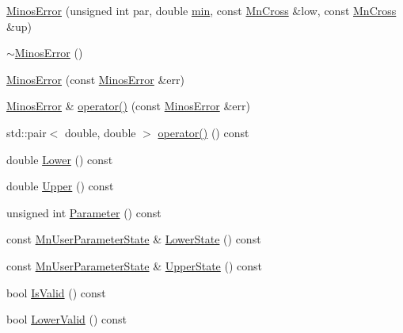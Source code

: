 \begin{DoxyCompactItemize}
\item 
\mbox{\hyperlink{classROOT_1_1Minuit2_1_1MinosError_a400609986f7b4e3a93eab1a35e1f33ce}{Minos\+Error}} (unsigned int par, double \mbox{\hyperlink{adat__devel_2lib_2SU3_2SU3__internal_8h_ab0f5fed3171eb00d1c5f037d9f518a23}{min}}, const \mbox{\hyperlink{classROOT_1_1Minuit2_1_1MnCross}{Mn\+Cross}} \&low, const \mbox{\hyperlink{classROOT_1_1Minuit2_1_1MnCross}{Mn\+Cross}} \&up)
\item 
\mbox{\hyperlink{classROOT_1_1Minuit2_1_1MinosError_a8373afe22cd395ed995a061691c48dad}{$\sim$\+Minos\+Error}} ()
\item 
\mbox{\hyperlink{classROOT_1_1Minuit2_1_1MinosError_a95d558825494f594da873fef3518572e}{Minos\+Error}} (const \mbox{\hyperlink{classROOT_1_1Minuit2_1_1MinosError}{Minos\+Error}} \&err)
\item 
\mbox{\hyperlink{classROOT_1_1Minuit2_1_1MinosError}{Minos\+Error}} \& \mbox{\hyperlink{classROOT_1_1Minuit2_1_1MinosError_ac45b7f3397fe4c13e1811b486e10602a}{operator()}} (const \mbox{\hyperlink{classROOT_1_1Minuit2_1_1MinosError}{Minos\+Error}} \&err)
\item 
std\+::pair$<$ double, double $>$ \mbox{\hyperlink{classROOT_1_1Minuit2_1_1MinosError_ae5c75a96400736de9741f6c5b8314e31}{operator()}} () const
\item 
double \mbox{\hyperlink{classROOT_1_1Minuit2_1_1MinosError_ac412aab9b0a59a427fbe7e3cfad47f0c}{Lower}} () const
\item 
double \mbox{\hyperlink{classROOT_1_1Minuit2_1_1MinosError_a0223fde13608aadee1f15b51d15b2bf6}{Upper}} () const
\item 
unsigned int \mbox{\hyperlink{classROOT_1_1Minuit2_1_1MinosError_a5d4ac177a8075a3698dbecac3a8c552b}{Parameter}} () const
\item 
const \mbox{\hyperlink{classROOT_1_1Minuit2_1_1MnUserParameterState}{Mn\+User\+Parameter\+State}} \& \mbox{\hyperlink{classROOT_1_1Minuit2_1_1MinosError_ac10a407a1cb13f4e0c1b4d21383d15df}{Lower\+State}} () const
\item 
const \mbox{\hyperlink{classROOT_1_1Minuit2_1_1MnUserParameterState}{Mn\+User\+Parameter\+State}} \& \mbox{\hyperlink{classROOT_1_1Minuit2_1_1MinosError_a89164c38dd7596c3164f1083eb9aac72}{Upper\+State}} () const
\item 
bool \mbox{\hyperlink{classROOT_1_1Minuit2_1_1MinosError_af6b7accfe397a06417ecc1f989d82e00}{Is\+Valid}} () const
\item 
bool \mbox{\hyperlink{classROOT_1_1Minuit2_1_1MinosError_a4b8c37c90bb53d98d3b4364a5ebc2228}{Lower\+Valid}} () const

\end{DoxyCompactItemize}
